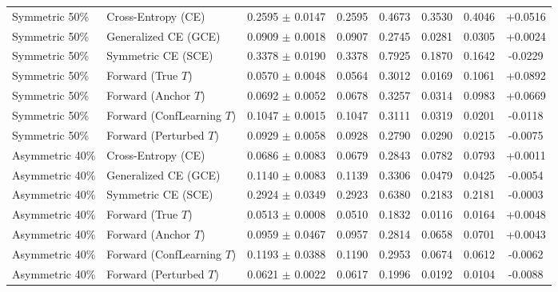 \begin{table}[t]
\begin{tabular}{llcccccc}
\hline
Symmetric 50\% & Cross-Entropy (CE) & 0.2595 $\pm$ 0.0147 & 0.2595 & 0.4673 & 0.3530 & 0.4046 & +0.0516 \\
Symmetric 50\% & Generalized CE (GCE) & 0.0909 $\pm$ 0.0018 & 0.0907 & 0.2745 & 0.0281 & 0.0305 & +0.0024 \\
Symmetric 50\% & Symmetric CE (SCE) & 0.3378 $\pm$ 0.0190 & 0.3378 & 0.7925 & 0.1870 & 0.1642 & -0.0229 \\
Symmetric 50\% & Forward (True $T$) & 0.0570 $\pm$ 0.0048 & 0.0564 & 0.3012 & 0.0169 & 0.1061 & +0.0892 \\
Symmetric 50\% & Forward (Anchor $T$) & 0.0692 $\pm$ 0.0052 & 0.0678 & 0.3257 & 0.0314 & 0.0983 & +0.0669 \\
Symmetric 50\% & Forward (ConfLearning $T$) & 0.1047 $\pm$ 0.0015 & 0.1047 & 0.3111 & 0.0319 & 0.0201 & -0.0118 \\
Symmetric 50\% & Forward (Perturbed $T$) & 0.0929 $\pm$ 0.0058 & 0.0928 & 0.2790 & 0.0290 & 0.0215 & -0.0075 \\
\hline
Asymmetric 40\% & Cross-Entropy (CE) & 0.0686 $\pm$ 0.0083 & 0.0679 & 0.2843 & 0.0782 & 0.0793 & +0.0011 \\
Asymmetric 40\% & Generalized CE (GCE) & 0.1140 $\pm$ 0.0083 & 0.1139 & 0.3306 & 0.0479 & 0.0425 & -0.0054 \\
Asymmetric 40\% & Symmetric CE (SCE) & 0.2924 $\pm$ 0.0349 & 0.2923 & 0.6380 & 0.2183 & 0.2181 & -0.0003 \\
Asymmetric 40\% & Forward (True $T$) & 0.0513 $\pm$ 0.0008 & 0.0510 & 0.1832 & 0.0116 & 0.0164 & +0.0048 \\
Asymmetric 40\% & Forward (Anchor $T$) & 0.0959 $\pm$ 0.0467 & 0.0957 & 0.2814 & 0.0658 & 0.0701 & +0.0043 \\
Asymmetric 40\% & Forward (ConfLearning $T$) & 0.1193 $\pm$ 0.0388 & 0.1190 & 0.2953 & 0.0674 & 0.0612 & -0.0062 \\
Asymmetric 40\% & Forward (Perturbed $T$) & 0.0621 $\pm$ 0.0022 & 0.0617 & 0.1996 & 0.0192 & 0.0104 & -0.0088 \\
\hline
\end{tabular}
\end{table}
